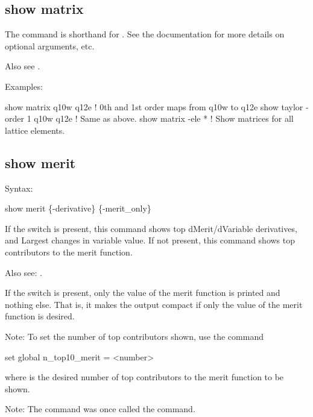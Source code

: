 {{{{{{{{%

\subsection{show matrix}
\label{s:show.matrix}

The  command is shorthand for . See the  documentation for more details on optional arguments, etc.

Also see .

Examples:
\begin{example}
  show matrix q10w q12e           ! 0th and 1st order maps from q10w to q12e
  show taylor -order 1 q10w q12e  ! Same as above.
  show matrix -ele *              ! Show matrices for all lattice elements.
\end{example} 


\subsection{show merit}
\label{s:show.merit}

Syntax:
\begin{example}
  show merit \{-derivative\} \{-merit_only\}
\end{example}

If the  switch is present, this command shows top dMerit/dVariable derivatives, and
Largest changes in variable value. If not present, this command shows top contributors to the merit
function.

Also see: .

If the  switch is present, only the value of the merit function is printed and
nothing else. That is, it makes the output compact if only the value of the merit function is
desired.

Note: To set the number of top contributors shown, use the command 
\begin{example}
  set global n_top10_merit = <number>
\end{example}
where  is the desired number of top contributors to the merit function to be shown.

Note: The  command was once called the  command.

}}}}}}}}
